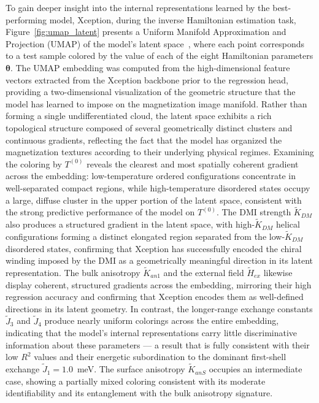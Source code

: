 \documentclass[letterpaper, 12, one column]{article}
\begin{document}
To gain deeper insight into the internal representations learned by
the best-performing model, Xception, during the inverse Hamiltonian
estimation task, Figure~\ref{fig:umap_latent} presents a Uniform
Manifold Approximation and Projection (UMAP) of the model's latent
space~\cite{ghojogh2021uniform}, where each point corresponds to a
test sample colored by the value of each of the eight Hamiltonian
parameters $\boldsymbol{\theta}$. The UMAP embedding was computed
from the high-dimensional feature vectors extracted from the Xception
backbone prior to the regression head, providing a two-dimensional
visualization of the geometric structure that the model has learned
to impose on the magnetization image manifold.
Rather than forming a single undifferentiated cloud, the latent
space exhibits a rich topological structure composed of several
geometrically distinct clusters and continuous gradients, reflecting
the fact that the model has organized the magnetization textures
according to their underlying physical regimes. Examining the
coloring by $T^{(0)}$ reveals the clearest and most spatially
coherent gradient across the embedding: low-temperature ordered
configurations concentrate in well-separated compact regions, while
high-temperature disordered states occupy a large, diffuse cluster
in the upper portion of the latent space, consistent with the strong
predictive performance of the model on $T^{(0)}$. The DMI strength
$\tilde{K}_{DM}$ also produces a structured gradient in the latent
space, with high-$\tilde{K}_{DM}$ helical configurations forming a
distinct elongated region separated from the low-$\tilde{K}_{DM}$
disordered states, confirming that Xception has successfully encoded
the chiral winding imposed by the DMI as a geometrically meaningful
direction in its latent representation. The bulk anisotropy
$\tilde{K}_{an1}$ and the external field $\tilde{H}_{ex}$ likewise
display coherent, structured gradients across the embedding, mirroring
their high regression accuracy and confirming that Xception encodes
them as well-defined directions in its latent geometry. In contrast,
the longer-range exchange constants $\tilde{J}_3$ and $\tilde{J}_4$
produce nearly uniform colorings across the entire embedding,
indicating that the model's internal representations carry little
discriminative information about these parameters --- a result that
is fully consistent with their low $R^2$ values and their energetic
subordination to the dominant first-shell exchange
$\tilde{J}_1 = 1.0$~meV. The surface anisotropy $\tilde{K}_{anS}$
occupies an intermediate case, showing a partially mixed coloring
consistent with its moderate identifiability and its entanglement
with the bulk anisotropy signature.
\end{document}
